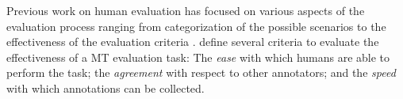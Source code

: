 

Previous work on human evaluation has focused on various aspects of the evaluation process ranging from 
categorization of the possible scenarios \cite{Sanders2011} to the effectiveness of the evaluation criteria \cite{callisonburch-EtAl:2007:WMT}. 
%
%
 define several criteria to evaluate the effectiveness of a MT evaluation task:
\Ni The \emph{ease} with which humans are able to perform the task; \Nii the \emph{agreement} with respect to other annotators; and \Niii the \emph{speed} with which annotations can be collected. %

